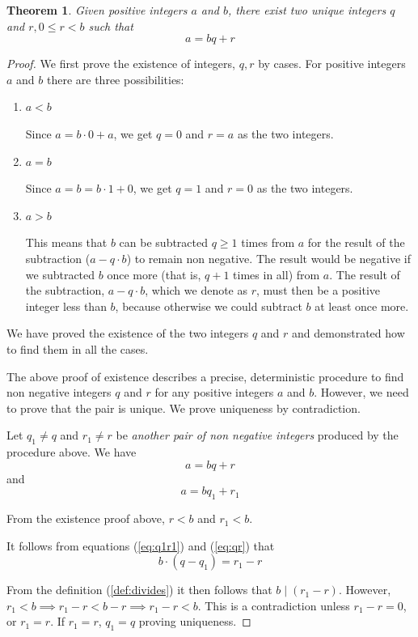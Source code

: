 \documentclass[english,notitlepage,smartquotes]{hgbreport}
\theoremstyle{definition}
\theoremstyle{remark}
\theoremstyle{plain}
\newtheorem{theorem}{Theorem}[chapter]
\begin{document}
\begin{theorem}
\label{thm:div-algo}
Given positive integers $a$ and $b$, there exist two unique integers $q$ and $r, 0\leq r<b$ such that  
$$
a=bq+r
$$
\end{theorem}
\begin{proof}
We first prove the existence of integers, $q,r$ by cases. For positive integers $a$ and $b$ there are three possibilities:
\begin{enumerate}
\item $a < b$

Since $a=b\cdot 0+a$, we get $q=0$ and $r=a$ as the two integers. 
\item $a=b$

Since $a=b=b\cdot 1+0$, we get $q=1$ and $r=0$ as the two integers. 
\item $a > b$

This means that $b$ can be subtracted $q\geq 1$ times from $a$ for the result of the subtraction ($a-q\cdot b$) to remain non negative. The result would be negative if we subtracted $b$ once more (that is, $q+1$ times in all) from $a$. The result of the subtraction, $a-q\cdot b$, which we denote as $r$, must then be a positive integer less than $b$, because otherwise we could subtract $b$ at least once more.
\end{enumerate}

We have proved the existence of the two integers $q$ and $r$ and demonstrated how to find them in all the cases. 

The above proof of existence describes a precise, deterministic procedure to find non negative integers $q$ and $r$ for any positive integers $a$ and $b$. However, we need to prove that the pair is unique. We prove uniqueness by contradiction.

Let $q_1\ne q$ and $r_1\ne r$ be \emph{another pair of non negative integers} produced by the procedure above. We have
\begin{equation}
\label{eq:qr}
a=bq+r
\end{equation}
and
\begin{equation}
\label{eq:q1r1}
a=bq_1+r_1
\end{equation}

From the existence proof above, $r<b$ and $r_1<b$.

It follows from equations (\ref{eq:q1r1}) and (\ref{eq:qr}) that
$$
b\cdot(q-q_1)=r_1-r
$$

From the definition (\ref{def:divides}) it then follows that $b\mid(r_1-r)$. However, $r_1<b\implies r_1-r<b-r\implies r_1-r<b$. This is a contradiction unless $r_1-r=0$, or $r_1=r$. If $r_1=r$, $q_1=q$ proving uniqueness.
\end{proof}
\end{document}
